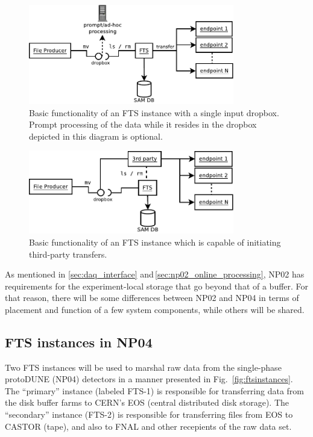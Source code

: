 \documentclass[12pt]{article}
\begin{document}
{\begin{figure}[tbh]
  \centering
  \includegraphics[width=0.8\textwidth]{figures/fts-basics.pdf}
  \caption{Basic functionality of an FTS instance with a single input dropbox.
Prompt processing of the data while it resides in the dropbox depicted in this diagram is optional.}
  \label{fig:ftsbasics}
\end{figure}

\begin{figure}[tbh]
  \centering
  \includegraphics[width=0.8\textwidth]{figures/fts-basics-3rd.pdf}
  \caption{Basic functionality of an FTS instance which is capable of initiating third-party transfers.}
  \label{fig:ftsbasicsthird}
\end{figure}

\noindent As mentioned in \ref{sec:daq_interface} and\,\ref{sec:np02_online_processing},
NP02 has requirements for the experiment-local storage that go beyond
that of a buffer. For that reason, there will be some differences between
NP02 and NP04 in terms of placement and function of a few system components,
while others will be shared.

\subsection{FTS instances in NP04}
\label{sec:prim_sec}
Two FTS instances will be used to marshal raw data from the single-phase protoDUNE (NP04)
detectors in a manner presented in Fig.~\ref{fig:ftsinstances}.  The
``primary'' instance (labeled FTS-1) is responsible for transferring data
from the disk buffer farms to CERN's EOS (central distributed disk storage).
 The ``secondary'' instance (FTS-2) is responsible for transferring files from EOS to
CASTOR (tape), and also to FNAL and other recepients of the raw data set.

}
\end{document}
